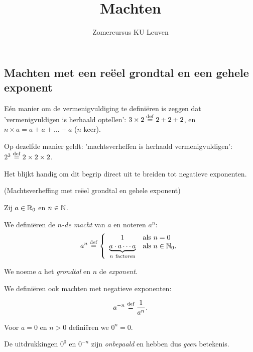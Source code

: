 \documentclass{ximera}
\author{Zomercursus KU Leuven}
\title[Rekenvaardigheden:]{Machten}
\begin{document}
\begin{abstract}
	
\end{abstract}
\maketitle

\subsection{Machten met een re\"eel grondtal en een gehele exponent}

Eén manier om de vermenigvuldiging te definiëren is zeggen dat 'vermenigvuldigen is herhaald optellen': $3\times 2 \overset{\mathrm{def}}{=} 2 + 2+ 2$, en $n\times a = a+a+\dots +a$ ($n$ keer). 

Op dezelfde manier geldt: 'machtsverheffen is herhaald vermenigvuldigen': $2^3 \overset{\mathrm{def}}{=} 2\times2\times2$. 

Het blijkt handig om dit begrip direct uit te breiden tot negatieve exponenten. 

\begin{definition}(Machtsverheffing met re\"eel grondtal en gehele exponent) \ 
	
	Zij $a\in\mathbb{R}_0$ en $n\in\mathbb{N}$. 
	
	We definiëren de \emph{$n$-de macht}  van $a$ en noteren $a^n$:
	\[a^n\overset{\mathrm{def}}{=}
	\left\{
	\begin{array}{cl}
	1 & \textrm{als }n=0 \\
	\underbrace{a\cdot a\cdots a}_{n\mathrm{\ factoren}} & \textrm{als }n\in\mathbb{N}_0. \\
	\end{array}
	\right.\]
	
	We noeme $a$ het \textit{grondtal} en $n$ de \textit{exponent}.
		
	We definiëren ook machten met negatieve exponenten:
	
	\[a^{-n}\overset{\mathrm{def}}{=}\frac{1}{a^n}.\]
	
	Voor $a=0$ en $n>0$ definiëren we $0^n = 0$. 
	
	De uitdrukkingen $0^0$ en $0^{-n}$ zijn \textit{onbepaald} en hebben dus \textit{geen} betekenis.
	
\end{definition}
\end{document}
